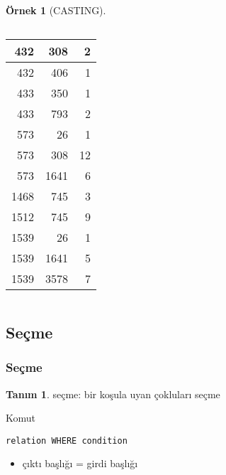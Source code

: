 \documentclass[dvipsnames]{beamer}
\theoremstyle{definition}
\newtheorem{tanim}[theorem]{Tanım}
\theoremstyle{example}
\newtheorem{ornek}[theorem]{Örnek}
\theoremstyle{plain}
\begin{document}
\begin{frame}
\begin{ornek}[CASTING]
\begin{columns}[b]
      \begin{tiny}
      \begin{table}
        \begin{tabular}{|r|r|r|}\hline
    432 &     308 &   2\\\hline
    432 &     406 &   1\\\hline
    433 &     350 &   1\\\hline
    433 &     793 &   2\\\hline
    573 &      26 &   1\\\hline
    573 &     308 &  12\\\hline
    573 &    1641 &   6\\\hline
   1468 &     745 &   3\\\hline
   1512 &     745 &   9\\\hline
   1539 &      26 &   1\\\hline
   1539 &    1641 &   5\\\hline
   1539 &    3578 &   7\\\hline
        \end{tabular}
      \end{table}
      \end{tiny}
    \end{columns}
  \end{ornek}
\end{frame}

\subsection{Seçme}

\begin{frame}[fragile]
  \frametitle{Seçme}

  \begin{tanim}
    \alert{seçme}: bir koşula uyan çokluları seçme
  \end{tanim}

  \pause
  \begin{block}{Komut}
    \begin{lstlisting}
relation WHERE condition
    \end{lstlisting}
  \end{block}

  \pause
  \begin{itemize}
    \item çıktı başlığı = girdi başlığı
  \end{itemize}
\end{frame}
\end{document}
